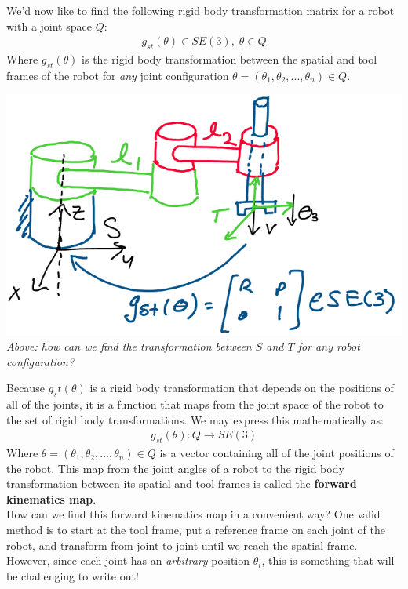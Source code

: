 \documentclass[oneside]{book}
\begin{document}
We'd now like to find the following rigid body transformation matrix for a robot with a joint space $Q$:
\begin{align}
    g_{st}(\theta) \in SE(3), \; \theta \in Q
\end{align}
Where $g_{st}(\theta)$ is the rigid body transformation between the spatial and tool frames of the robot for \textit{any} joint configuration $\theta = (\theta_1, \theta_2, ..., \theta_n) \in Q$.
\begin{center}
    \includegraphics[scale=0.3]{images/gst_theta.png}\\
    \textit{Above: how can we find the transformation between $S$ and $T$ for \textit{any} robot configuration?}
\end{center}
Because $g_st(\theta)$ is a rigid body transformation that depends on the positions of all of the joints, it is a function that maps from the joint space of the robot to the set of rigid body transformations. We may express this mathematically as:
\begin{align}
    g_{st}(\theta): Q \to SE(3)
\end{align}
Where $\theta = (\theta_1, \theta_2, ..., \theta_n) \in Q$ is a vector containing all of the joint positions of the robot. This map from the joint angles of a robot to the rigid body transformation between its spatial and tool frames is called the \textbf{forward kinematics map}.\\
How can we find this forward kinematics map in a convenient way? One valid method is to start at the tool frame, put a reference frame on each joint of the robot, and transform from joint to joint until we reach the spatial frame. However, since each joint has an \textit{arbitrary} position $\theta_i$, this is something that will be challenging to write out!\\
\end{document}
